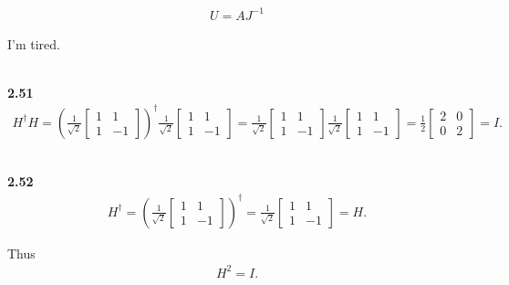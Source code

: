 \documentclass[10pt]{book}
\newcommand{\Textbf}[1]{\hspace{3mm}\\ \textbf{#1}\\}
\begin{document}
	
	\begin{equation}
\begin{aligned}
		U = AJ^{-1}
	\end{aligned}
\end{equation}
	
	I'm tired.
	
	
	
	
	\Textbf{2.51}
	
	\begin{equation}
\begin{aligned}
		H^\dagger H = \left(\frac{1}{\sqrt{2}} \begin{bmatrix}
			1 & 1 \\
			1 & -1
		\end{bmatrix}\right)^\dagger
		\frac{1}{\sqrt{2}} \begin{bmatrix}
			1 & 1 \\
			1 & -1
		\end{bmatrix}
		=
		\frac{1}{\sqrt{2}} \begin{bmatrix}
			1 & 1 \\
			1 & -1
		\end{bmatrix}
		\frac{1}{\sqrt{2}} \begin{bmatrix}
			1 & 1 \\
			1 & -1
		\end{bmatrix}
		=
		\frac{1}{2} \begin{bmatrix}
			2 & 0 \\
			0 & 2
		\end{bmatrix}
		=
		I.
	\end{aligned}
\end{equation}
	
	
	
	
	\Textbf{2.52}
	
	\begin{equation}
\begin{aligned}
		H^\dagger = \left(\frac{1}{\sqrt{2}} \begin{bmatrix}
			1 & 1 \\
			1 & -1
		\end{bmatrix}\right)^\dagger
		=
		\frac{1}{\sqrt{2}} \begin{bmatrix}
			1 & 1 \\
			1 & -1
		\end{bmatrix}
		=
		H.
	\end{aligned}
\end{equation}
	
	Thus
	\begin{equation}
\begin{aligned}
		H^2 = I.
	\end{aligned}
\end{equation}
	
\end{document}
